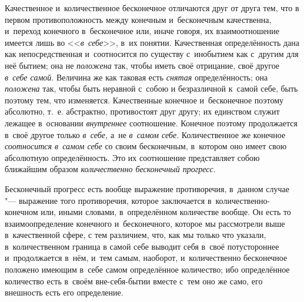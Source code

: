 Качественное и~количественное бесконечное отличаются друг от друга тем, что
в первом противоположность между конечным и~бесконечным качественна, и~переход
конечного в~бесконечное или, иначе говоря, их взаимоотношение имеется лишь во
<<{\em в~себе}>>, в~их понятии. Качественная определённость дана как
непосредственная и~соотносится по существу с~инобытием как с~другим для неё
бытием; она не {\em положена} так, чтобы иметь своё отрицание, своё другое
{\em в~себе самой}. Величина же как таковая есть {\em снятая}
определённость; она {\em положена} так, чтобы быть неравной с~собою и
безразличной к~самой себе, быть поэтому тем, что изменяется. Качественные
конечное и~бесконечное поэтому абсолютно, т.~е. абстрактно, противостоят друг
другу; их единством служит лежащее в~основании {\em внутреннее} соотношение.
Конечное поэтому продолжается в~своё другое только {\em в~себе,} а~не
{\em в~самом себе}. Количественное же конечное {\em соотносится в~самом себе}
со своим бесконечным, в~котором оно имеет свою абсолютную определённость. Это
их соотношение представляет собою ближайшим образом
{\em количественно бесконечный прогресс}.


Бесконечный прогресс есть вообще выражение противоречия, в~данном случае "---
выражение того противоречия, которое заключается в~количественно-конечном или,
иными словами, в~определённом количестве вообще. Он есть то взаимоопределение
конечного и~бесконечного, которое мы рассмотрели выше в~качественной сфере,
с тем различием, что, как мы только что указали, в~количественном граница
в самой себе выводит себя в~своё потустороннее и~продолжается в~нём, и~тем
самым, наоборот, и~количественно бесконечное положено имеющим в~себе самом
определённое количество; ибо определённое количество есть в~своём
вне-себя-бытии вместе с~тем оно же само, его внешность есть его определение.

